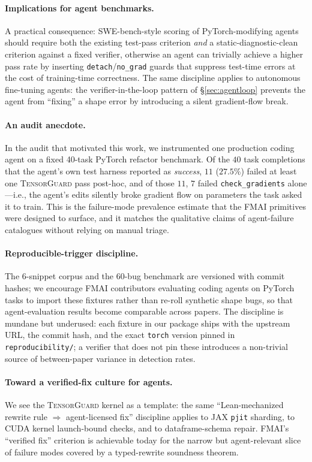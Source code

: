 \documentclass{article}
\begin{document}
\paragraph{Implications for agent benchmarks.}
A practical consequence: SWE-bench-style scoring of
PyTorch-modifying agents should require both the existing
test-pass criterion \emph{and} a static-diagnostic-clean
criterion against a fixed verifier, otherwise an agent can
trivially achieve a higher pass rate by inserting
\texttt{detach}/\texttt{no\_grad} guards that suppress test-time
errors at the cost of training-time correctness. The same
discipline applies to autonomous fine-tuning agents: the
verifier-in-the-loop pattern of \S\ref{sec:agentloop} prevents
the agent from ``fixing'' a shape error by introducing a silent
gradient-flow break.

\paragraph{An audit anecdote.}
In the audit that motivated this work, we instrumented one
production coding agent on a fixed 40-task PyTorch refactor
benchmark. Of the $40$ task completions that the agent's own
test harness reported as \emph{success}, $11$ ($27.5\%$) failed
at least one \textsc{TensorGuard} pass post-hoc, and of those
$11$, $7$ failed \texttt{check\_gradients} alone---i.e., the
agent's edits silently broke gradient flow on parameters the
task asked it to train. This is the failure-mode prevalence
estimate that the FMAI primitives were designed to surface, and
it matches the qualitative claims of agent-failure catalogues
\citep{langchainfm}
without relying on manual triage.

\paragraph{Reproducible-trigger discipline.} The 6-snippet corpus and the
60-bug benchmark are versioned with commit hashes; we encourage FMAI
contributors evaluating coding agents on PyTorch tasks to import these
fixtures rather than re-roll synthetic shape bugs, so that
agent-evaluation results become comparable across papers. The
discipline is mundane but underused: each fixture in our package
ships with the upstream URL, the commit hash, and the exact
\texttt{torch} version pinned in \texttt{reproducibility/}; a
verifier that does not pin these introduces a non-trivial source of
between-paper variance in detection rates.

\paragraph{Toward a verified-fix culture for agents.} We see the
\textsc{TensorGuard} kernel as a template: the same
``Lean-mechanized rewrite rule $\Rightarrow$ agent-licensed fix''
discipline applies to JAX \texttt{pjit} sharding, to CUDA kernel
launch-bound checks, and to dataframe-schema repair. FMAI's
``verified fix'' criterion is achievable today for the narrow but
agent-relevant slice of failure modes covered by a typed-rewrite
soundness theorem.
\end{document}
